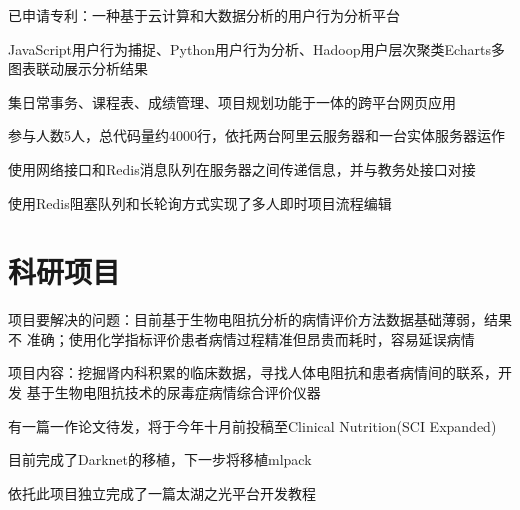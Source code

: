 \documentclass[]{deedy-resume-openfont}
\begin{document}
\begin{minipage}[t]{0.73\textwidth}
	\begin{tightemize}
		\item 已申请专利：一种基于云计算和大数据分析的用户行为分析平台
		\item JavaScript用户行为捕捉、Python用户行为分析、Hadoop用户层次聚类Echarts多 图表联动展示分析结果
	\end{tightemize}
	\sectionsep

	\begin{tightemize}
		\item 集日常事务、课程表、成绩管理、项目规划功能于一体的跨平台网页应用
		\item 参与人数5人，总代码量约4000行，依托两台阿里云服务器和一台实体服务器运作
		\item 使用网络接口和Redis消息队列在服务器之间传递信息，并与教务处接口对接
		\item 使用Redis阻塞队列和长轮询方式实现了多人即时项目流程编辑
	\end{tightemize}
	\sectionsep
	
	\section{科研项目}
	\descript{}
	\begin{tightemize}
		\item 项目要解决的问题：目前基于生物电阻抗分析的病情评价方法数据基础薄弱，结果不 准确；使用化学指标评价患者病情过程精准但昂贵而耗时，容易延误病情
        \item 项目内容：挖掘肾内科积累的临床数据，寻找人体电阻抗和患者病情间的联系，开发 基于生物电阻抗技术的尿毒症病情综合评价仪器
		\item 有一篇一作论文待发，将于今年十月前投稿至Clinical Nutrition(SCI Expanded)
	\end{tightemize}
	\sectionsep

	\descript{}
	\begin{tightemize}
		\item 目前完成了Darknet的移植，下一步将移植mlpack
		\item 依托此项目独立完成了一篇太湖之光平台开发教程
	\end{tightemize}
    \sectionsep
	

\end{minipage}
\end{document}
